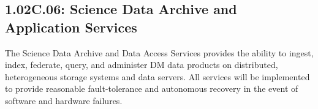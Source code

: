 \subsection*{1.02C.06: Science Data Archive and Application Services}

The Science Data Archive and Data Access Services provides the ability to ingest, index, federate, query, and administer DM data products on distributed, heterogeneous storage systems and data servers. All services will be implemented to provide reasonable fault-tolerance and autonomous recovery in the event of software and hardware failures.
